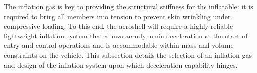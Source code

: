The inflation gas is key to providing the structural stiffness for the inflatable: it is required to bring all members into tension to prevent skin wrinkling under compressive loading. To this end, the aeroshell will require a highly reliable lightweight inflation system that allows aerodynamic deceleration at the start of entry and control operations and is accommodable within mass and volume constraints on the vehicle. This subsection details the selection of an inflation gas and design of the inflation system upon which deceleration capability hinges.



